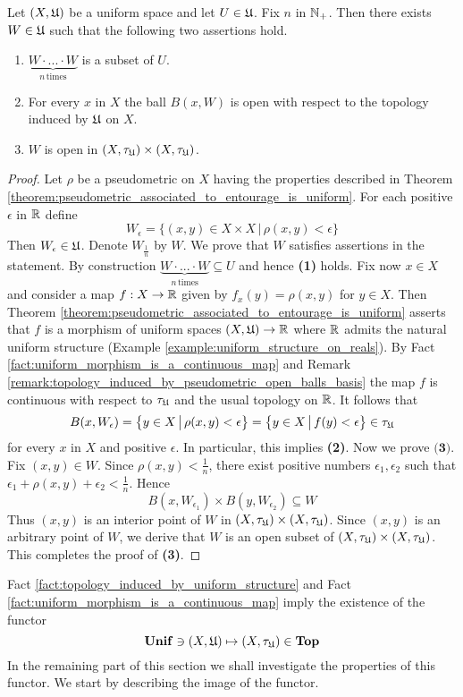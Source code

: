\begin{theorem}\label{theorem:each_entourage_contains_open_entourage}
Let $(X,{\mathfrak U})$ be a uniform space and let $U \in {\mathfrak U}$. Fix $n$ in ${\mathbb N}_+$. Then there exists $W \in {\mathfrak U}$ such that the following two assertions hold.
\begin{enumerate}[label=\emph{\textbf{(\arabic*)}}, leftmargin=*]
\item $\underbrace{W\cdot ...\cdot W}_{n\,\mathrm{times}}$ is a subset of $U$.
\item For every $x$ in $X$ the ball $B(x,W)$ is open with respect to the topology induced by ${\mathfrak U}$ on $X$. 
\item $W$ is open in $\left(X,\tau_{{\mathfrak U}}\right)\times \left(X,\tau_{{\mathfrak U}}\right)$.
\end{enumerate}
\end{theorem}
\begin{proof}
Let $\rho$ be a pseudometric on $X$ having the properties described in Theorem \ref{theorem:pseudometric_associated_to_entourage_is_uniform}. For each positive $\epsilon$ in ${\mathbb R}$ define 
$$W_{\epsilon} = \big\{(x,y)\in X\times X\,\big|\,\rho(x,y) < \epsilon\big\}$$
Then $W_{\epsilon} \in {\mathfrak U}$. Denote $W_{\frac{1}{n}}$ by $W$. We prove that $W$ satisfies assertions in the statement. By construction $\underbrace{W\cdot ...\cdot W}_{n\,\mathrm{times}} \subseteq U$ and hence \textbf{(1)} holds. Fix now $x \in X$ and consider a map $f:X\rightarrow {\mathbb R}$ given by $f_x(y) = \rho(x,y)$ for $y\in X$. Then Theorem \ref{theorem:pseudometric_associated_to_entourage_is_uniform} asserts that $f$ is a morphism of uniform spaces $\left(X,{\mathfrak U}\right)\rightarrow {\mathbb R}$ where ${\mathbb R}$ admits the natural uniform structure (Example \ref{example:uniform_structure_on_reals}). By Fact \ref{fact:uniform_morphism_is_a_continuous_map} and Remark \ref{remark:topology_induced_by_pseudometric_open_balls_basis} the map $f$ is continuous with respect to $\tau_{{\mathfrak U}}$ and the usual topology on ${\mathbb R}$. It follows that
$$B(x,W_{\epsilon}) = \big\{y\in X\,\big|\,\rho(x,y) < \epsilon\big\} = \big\{y\in X\,\big|\,f(y) < \epsilon\big\}\in \tau_{{\mathfrak U}}$$
for every $x$ in $X$ and positive $\epsilon$. In particular, this implies \textbf{(2)}. Now we prove $\textbf{(3)}$. Fix $(x,y) \in W$. Since $\rho(x,y) < \frac{1}{n}$, there exist positive numbers $\epsilon_1,\epsilon_2$ such that $\epsilon_1 + \rho(x,y) + \epsilon_2 < \frac{1}{n}$. Hence 
$$B(x,W_{\epsilon_1})\times B(y,W_{\epsilon_2}) \subseteq W$$
Thus $(x,y)$ is an interior point of $W$ in $\left(X,\tau_{{\mathfrak U}}\right)\times \left(X,\tau_{{\mathfrak U}}\right)$. Since $(x,y)$ is an arbitrary point of $W$, we derive that $W$ is an open subset of $\left(X,\tau_{{\mathfrak U}}\right)\times \left(X,\tau_{{\mathfrak U}}\right)$. This completes the proof of \textbf{(3)}.
\end{proof}
\noindent
Fact \ref{fact:topology_induced_by_uniform_structure} and Fact \ref{fact:uniform_morphism_is_a_continuous_map} imply the existence of the functor 
$$\mathbf{Unif} \ni (X,{\mathfrak U}) \mapsto (X,\tau_{{\mathfrak U}})\in   \mathbf{Top}$$
In the remaining part of this section we shall investigate the properties of this functor. We start by describing the image of the functor.

